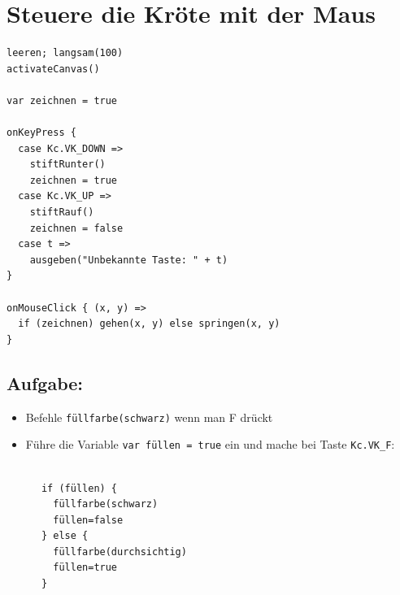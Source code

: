 \chapter{Steuere die Kröte mit der Maus}
\begin{multicols}{2}

\begin{lstlisting}[basicstyle={\ttfamily\fontsize{16}{19}\selectfont},numbers=none]
leeren; langsam(100)
activateCanvas()

var zeichnen = true

onKeyPress {
  case Kc.VK_DOWN =>
    stiftRunter()
    zeichnen = true
  case Kc.VK_UP =>
    stiftRauf()
    zeichnen = false
  case t =>
    ausgeben("Unbekannte Taste: " + t)
}

onMouseClick { (x, y) =>
  if (zeichnen) gehen(x, y) else springen(x, y)
}
\end{lstlisting}
        


\columnbreak


\section*{\color{BrickRed}Aufgabe:}


\begin{itemize}

\item {Befehle \lstinline{füllfarbe(schwarz)} wenn man F drückt}
\item {Führe die Variable \lstinline{var füllen = true} ein und mache bei Taste \lstinline{Kc.VK_F}:}

\end{itemize}



\begin{lstlisting}[numbers=none]

      if (füllen) {
        füllfarbe(schwarz)
        füllen=false
      } else {
        füllfarbe(durchsichtig)
        füllen=true
      }
      
\end{lstlisting}
        
\end{multicols}

